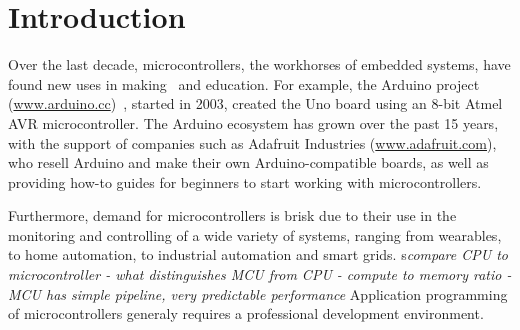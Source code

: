 \section{Introduction}
\label{sec:intro}

Over the last decade, microcontrollers, the workhorses of embedded systems, have found
new uses in making~\cite{dougherty2012maker} and education. For example, the Arduino project
(\url{www.arduino.cc})~\cite{buildingArduino2014},
started in 2003, created the Uno board using an 8-bit Atmel
AVR microcontroller. 
The Arduino ecosystem has grown over the past 15 years,
with the support of companies such as Adafruit Industries (\url{www.adafruit.com}), 
who resell Arduino and make their own Arduino-compatible boards, as well as providing
how-to guides for beginners to start working with microcontrollers.

Furthermore, demand for microcontrollers is brisk due to their use in the monitoring and controlling
of a wide variety of systems, ranging from wearables, to home automation, to industrial 
automation and smart grids. s\emph{compare CPU to microcontroller - what distinguishes MCU from CPU - 
compute to memory ratio - MCU has simple pipeline, very predictable performance}
Application programming of microcontrollers generaly requires a professional
development environment. 




